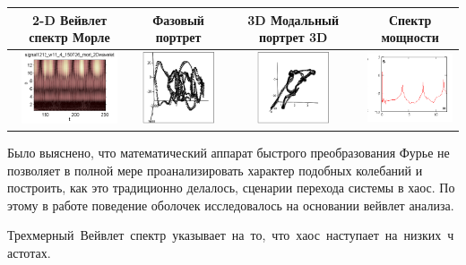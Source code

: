 \documentclass[12pt,letterpaper]{extreport}
\begin{document}
\begin{table}[H]
{\begin{tabular}{|c|c|c|c|}
\hline
\footnotesize 2-D Вейвлет спектр Морле&\footnotesize 
Фазовый портрет&\footnotesize 3D	Модальный портрет 
3D&\footnotesize Спектр мощности\\
\hline
	\includegraphics[height = 80px]{e1} 	
	&	
	\includegraphics[height = 80px]{e2} 	
	&	
	\includegraphics[height = 80px]{e3} 
	&
	\includegraphics[height = 80px]{e4} 
\\
\hline
\end{tabular}

}
\end{table}	
\par Было выяснено, что математический аппарат быстрого 
преобразования Фурье не позволяет в полной мере 
проанализировать характер подобных колебаний и 
построить, как это традиционно делалось, сценарии 
перехода системы в хаос. По этому в работе поведение 
оболочек исследовалось на основании вейвлет анализа.
\par \mbox {Трехмерный Вейвлет спектр указывает на то, 
что хаос наступает на низких частотах.}
\end{document}
